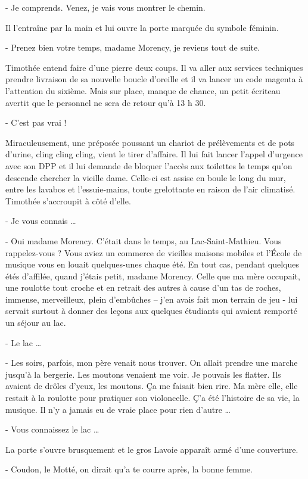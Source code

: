 - Je comprends. Venez, je vais vous montrer le chemin.

Il l’entraîne par la main et lui ouvre la porte marquée du symbole féminin.

- Prenez bien votre temps, madame Morency, je reviens tout de suite.

Timothée entend faire d’une pierre deux coups. Il va aller aux services techniques prendre livraison de sa nouvelle boucle d’oreille et il va lancer un code magenta à l’attention du sixième. Mais sur place, manque de chance, un petit écriteau avertit que le personnel ne sera de retour qu’à 13 h 30.

- C’est pas vrai !

Miraculeusement, une préposée poussant un chariot de prélèvements et de pots d’urine, cling cling cling, vient le tirer d’affaire. Il lui fait lancer l’appel d’urgence avec son DPP et il lui demande de bloquer l’accès aux toilettes le temps qu’on descende chercher la vieille dame. Celle-ci est assise en boule le long du mur, entre les lavabos et l’essuie-mains, toute grelottante en raison de l’air climatisé. Timothée s’accroupit à côté d’elle.

- Je vous connais …

- Oui madame Morency. C’était dans le temps, au Lac-Saint-Mathieu. Vous rappelez-vous ? Vous aviez un commerce de vieilles maisons mobiles et l’École de musique vous en louait quelques-unes chaque été. En tout cas, pendant quelques étés d’affilée, quand j’étais petit, madame Morency. Celle que ma mère occupait, une roulotte tout croche et en retrait des autres à cause d’un tas de roches, immense, merveilleux, plein d’embûches – j’en avais fait mon terrain de jeu - lui servait surtout à donner des leçons aux quelques étudiants qui avaient remporté un séjour au lac.

- Le lac …

- Les soirs, parfois, mon père venait nous trouver. On allait prendre une marche jusqu’à la bergerie. Les moutons venaient me voir. Je pouvais les flatter. Ils avaient de drôles d’yeux, les moutons. Ça me faisait bien rire. Ma mère elle, elle restait à la roulotte pour pratiquer son violoncelle. Ç’a été l’histoire de sa vie, la musique. Il n’y a jamais eu de vraie place pour rien d’autre …

- Vous connaissez le lac …

La porte s’ouvre brusquement et le gros Lavoie apparaît armé d’une couverture.

- Coudon, le Motté, on dirait qu’a te courre après, la bonne femme.

